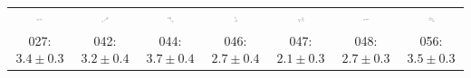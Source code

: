 \begin{tabular}{|c c c c c c c|}
\includegraphics[width = 0.14\textwidth]{2DImages/SAMPL5_004.pdf} & \includegraphics[width = 0.14\textwidth]{2DImages/SAMPL5_005.pdf} & \includegraphics[width = 0.14\textwidth]{2DImages/SAMPL5_007.pdf} & \includegraphics[width = 0.14\textwidth]{2DImages/SAMPL5_010.pdf} & \includegraphics[width = 0.14\textwidth]{2DImages/SAMPL5_011.pdf} & \includegraphics[width = 0.14\textwidth]{2DImages/SAMPL5_021.pdf} & \includegraphics[width = 0.14\textwidth]{2DImages/SAMPL5_026.pdf} \\ 
{\scriptsize 027: $ 3.4 \pm 0.3 $ } & {\scriptsize 042: $ 3.2 \pm 0.4 $ } & {\scriptsize 044: $ 3.7 \pm 0.4 $ } & {\scriptsize 046: $ 2.7 \pm 0.4 $ } & {\scriptsize 047: $ 2.1 \pm 0.3 $ } & {\scriptsize 048: $ 2.7 \pm 0.3 $ } & {\scriptsize 056: $ 3.5 \pm 0.3 $ } \\ 

\end{tabular}
